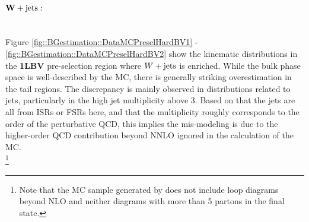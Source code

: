 \paragraph{\underline{$\bf{W+\mathrm{jets}:}$}}  \mbox{} \\
Figure \ref{fig::BGestimation::DataMCPreselHardBV1} - \ref{fig::BGestimation::DataMCPreselHardBV2} show the kinematic distributions in the \textbf{1LBV} pre-selection region where $W+\mathrm{jets}$ is enriched. While the bulk phase space is well-described by the MC, there is generally striking overestimation in the tail regions. The discrepancy is mainly observed in distributions related to jets, particularly in the high jet multiplicity above 3. Based on that the jets are all from ISRs or FSRs here, and that the multiplicity roughly corresponds to the order of the perturbative QCD, this implies the mis-modeling is due to the higher-order QCD contribution beyond NNLO ignored in the calculation of the MC. \\
\footnote{Note that the MC sample generated by  does not include loop diagrams beyond NLO and neither diagrams with more than 5 partons in the final state.}
%
%
%
